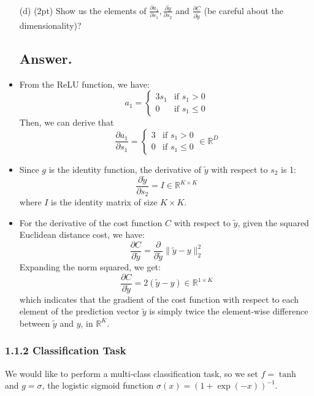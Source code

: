 \documentclass{article}
\begin{document}
\begin{itemize}
  
        
    \item[(d)] (2pt) Show us the elements of $\frac{\partial a_1}{\partial s_1}, \frac{\partial \tilde{y}}{\partial s_2}$ and $\frac{\partial C}{\partial \tilde{y}}$ (be careful about the dimensionality)?
    \subsection*{Answer.}
    \item From the ReLU function, we have:
    \[a_1 = 
    \begin{cases}
    3s_1 & \text{if } s_{1} > 0 \\
    0 & \text{if } s_{1} \leq 0
    \end{cases}
    \]
    Then, we can derive that 
    \[ \frac{\partial a_1}{\partial s_1} = 
    \begin{cases}
    3 & \text{if } s_{1} > 0 \\
    0 & \text{if } s_{1} \leq 0
    \end{cases}
    \in \mathbb{R}^{D}
    \]
    
    \item Since \(g\) is the identity function, the derivative of \(\tilde{y}\) with respect to \(s_2\) is 1:
    \[ \frac{\partial \tilde{y}}{\partial s_2} = I \in \mathbb{R}^{K \times K} \]
    where \(I\) is the identity matrix of size \(K \times K\).
    
    \item For the derivative of the cost function \(C\) with respect to \(\tilde{y}\), given the squared Euclidean distance cost, we have:
    \[ \frac{\partial C}{\partial \tilde{y}} = \frac{\partial}{\partial \tilde{y}} \| \tilde{y} - y \|_2^2 \]
    Expanding the norm squared, we get:
    \[ \frac{\partial C}{\partial \tilde{y}} = 2 (\tilde{y} - y) \in \mathbb{R}^{1 \times K} \]
    which indicates that the gradient of the cost function with respect to each element of the prediction vector \(\tilde{y}\) is simply twice the element-wise difference between \(\tilde{y}\) and \(y\), in \(\mathbb{R}^K\).
    
\end{itemize}

\subsubsection*{1.1.2 Classification Task}

We would like to perform a multi-class classification task, so we set $f = \tanh$ and $g = \sigma$, the logistic sigmoid function $\sigma(x) = ({1 + \exp(-x)})^{-1}$.
\end{document}
